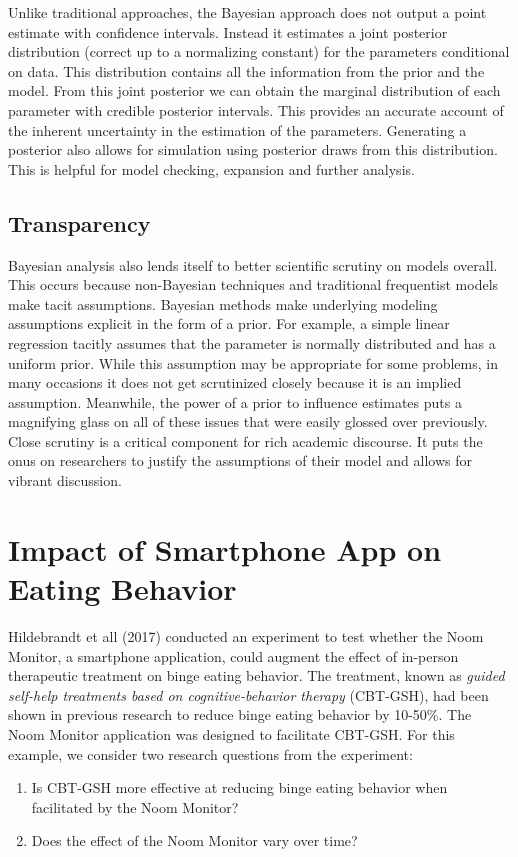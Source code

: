 \documentclass[12pt, oneside]{article}
\begin{document}
Unlike traditional approaches, the Bayesian approach does not output a point estimate with confidence intervals. Instead it estimates a joint posterior distribution (correct up to a normalizing constant) for the parameters conditional on data. This distribution contains all the information from the prior and the model. From this joint posterior we can obtain the marginal distribution of each parameter with credible posterior intervals. This provides an accurate account of the inherent uncertainty in the estimation of the parameters. Generating a posterior also allows for simulation using posterior draws from this distribution. This is helpful for model checking, expansion and further analysis.

\subsection{Transparency}
Bayesian analysis also lends itself to better scientific scrutiny on models overall. This occurs because non-Bayesian techniques and traditional frequentist models make tacit assumptions. Bayesian methods make underlying modeling assumptions explicit in the form of a prior. For example, a simple linear regression tacitly assumes that the parameter is normally distributed and has a uniform prior. While this assumption may be appropriate for some problems, in many occasions it does not get scrutinized closely because it is an implied assumption. Meanwhile, the power of a prior to influence estimates puts a magnifying glass on all of these issues that were easily glossed over previously.  Close scrutiny is a critical component for rich academic discourse. It puts the onus on researchers to justify the assumptions of their model and allows for vibrant discussion. 

\section{Impact of Smartphone App on Eating Behavior}

Hildebrandt et all (2017) conducted an experiment to test whether the Noom Monitor, a smartphone application, could augment the effect of in-person therapeutic treatment on binge eating behavior.  The treatment, known as \emph{guided self-help treatments based on cognitive-behavior therapy} (CBT-GSH), had been shown in previous research to reduce binge eating behavior by 10-50\%.  The Noom Monitor application was designed to facilitate CBT-GSH.  For this example, we consider two research questions from the experiment:
\begin{enumerate}
\item{Is CBT-GSH more effective at reducing binge eating behavior when facilitated by the Noom Monitor?}
\item{Does the effect of the Noom Monitor vary over time?}
\end{enumerate}
\end{document}
